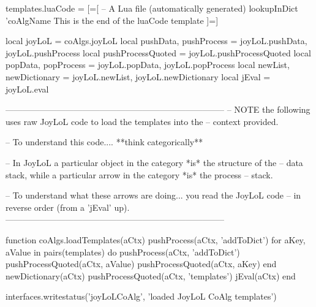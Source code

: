 templates.luaCode = [=[
-- A Lua file (automatically generated)
{{ lookupInDict 'coAlgName }}
This is the end of the luaCode template
]=]

local joyLoL = coAlgs.joyLoL
local pushData, pushProcess = joyLoL.pushData, joyLoL.pushProcess
local pushProcessQuoted = joyLoL.pushProcessQuoted
local popData, popProcess   = joyLoL.popData, joyLoL.popProcess
local newList, newDictionary = joyLoL.newList, joyLoL.newDictionary
local jEval = joyLoL.eval

-----------------------------------------------------------------------------
-- NOTE the following uses raw JoyLoL code to load the templates into the 
-- context provided. 

-- To understand this code.... **think categorically**

-- In JoyLoL a particular object in the category *is* the structure of the 
-- data stack, while a particular arrow in the category *is* the process 
-- stack.

-- To understand what these arrows are doing... you read the JoyLoL code 
-- in reverse order (from a 'jEval' up). 
-----------------------------------------------------------------------------

function coAlgs.loadTemplates(aCtx)
  pushProcess(aCtx, 'addToDict')
  for aKey, aValue in pairs(templates) do
    pushProcess(aCtx, 'addToDict')
    pushProcessQuoted(aCtx, aValue)
    pushProcessQuoted(aCtx, aKey)
  end
  newDictionary(aCtx)
  pushProcessQuoted(aCtx, 'templates')
  jEval(aCtx)
end

interfaces.writestatus('joyLoLCoAlg', 'loaded JoyLoL CoAlg templates')
\stopLuaTemplate

\stopchapter
